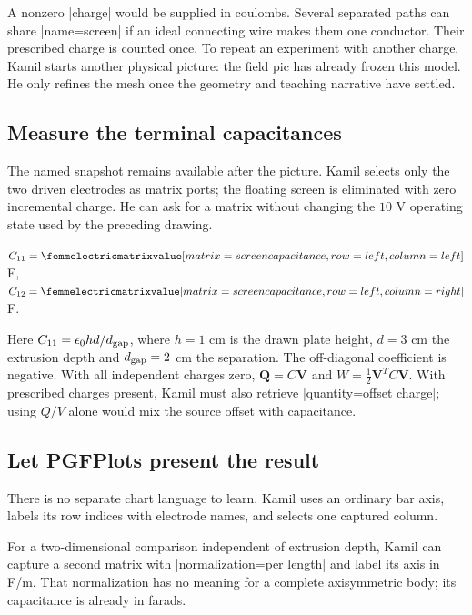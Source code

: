 A nonzero |charge| would be supplied in coulombs. Several separated paths can
share |name=screen| if an ideal connecting wire makes them one conductor.
Their prescribed charge is counted once. To repeat an experiment with another
charge, Kamil starts another physical picture: the field pic has already frozen
this model. He only refines the mesh once the geometry and teaching narrative
have settled.

\subsection{Measure the terminal capacitances}
The named snapshot remains available after the picture. Kamil selects only
the two driven electrodes as matrix ports; the floating screen is eliminated
with zero incremental charge. He can ask for a matrix without changing the
$10$ V operating state used by the preceding drawing.

\Needspace{6cm}
\begin{codeexample}[width=0pt]
\femmelectricmatrix[name=screen capacitance,model=screen cell,
    electrodes={left,right}]
$C_{11}=\femmelectricmatrixvalue[matrix=screen capacitance,
    row=left,column=left]$ F,
\quad
$C_{12}=\femmelectricmatrixvalue[matrix=screen capacitance,
    row=left,column=right]$ F.
\end{codeexample}

Here $C_{11}=\epsilon_0 hd/d_{\rm gap}$, where $h=1$ cm is the drawn plate
height, $d=3$ cm the extrusion depth and $d_{\rm gap}=2$ cm the separation.
The off-diagonal coefficient is negative. With all independent charges zero,
$\mathbf Q=C\mathbf V$ and $W=\tfrac12\mathbf V^TC\mathbf V$.
With prescribed charges present, Kamil must also retrieve |quantity=offset charge|;
using $Q/V$ alone would mix the source offset with capacitance.

\subsection{Let PGFPlots present the result}
There is no separate chart language to learn. Kamil uses an ordinary bar axis,
labels its row indices with electrode names, and selects one captured column.

\Needspace{11cm}
\begin{codeexample}[width=0pt]
\begin{tikzpicture}
  \begin{axis}[width=7cm,height=4.5cm,ybar,
      xtick={1,2},xticklabels={Left plate,Right plate},
      xlabel={Receiving electrode},ylabel={$C_{i1}$ (F)},
      ymin=-1.8e-13,ymax=1.8e-13,enlarge x limits=.5,
      ymajorgrids,bar width=14pt]
    \femmelectricmatrixplot[matrix=screen capacitance,column=left,
      plot options={fill=blue!30,draw=blue!60!black}]
  \end{axis}
\end{tikzpicture}
\end{codeexample}

For a two-dimensional comparison independent of extrusion depth, Kamil can
capture a second matrix with |normalization=per length| and label its axis
in F/m. That normalization has no meaning for a complete axisymmetric body;
its capacitance is already in farads.
